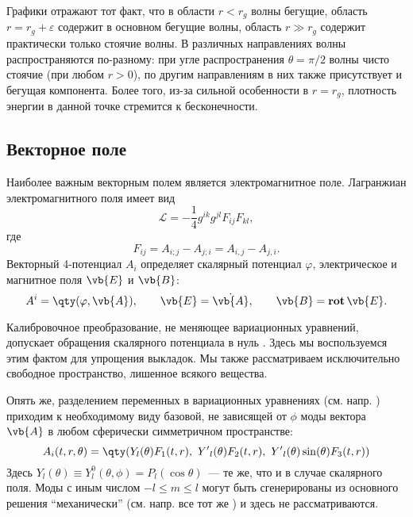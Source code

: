 \documentclass[\docroot/reports/draft/report.tex]{subfiles}
\begin{document}
        Графики отражают тот факт, что в области $r < r_g$ волны бегущие, область $r = r_g + \varepsilon$ содержит в основном бегущие волны, область $r \gg r_g$ содержит практически только стоячие волны. В различных направлениях волны распространяются по-разному: при угле распространения $\theta = \pi/2$ волны чисто стоячие (при любом $r > 0$), по другим направлениям в них также присутствует и бегущая компонента. Более того, из-за сильной особенности в $r = r_g$, плотность энергии в данной точке стремится к бесконечности.

\subsection{Векторное поле}

    Наиболее важным векторным полем является электромагнитное поле. Лагранжиан электромагнитного поля имеет вид \cite{landau_v2}
    \begin{equation*}
        \mathcal{L} = - \frac{1}{4} g^{ik} g^{jl} F_{ij} F_{kl} ,
    \end{equation*}
    где
    \begin{equation*}
        F_{ij} = A_{i;j} - A_{j;i} = A_{i,j} - A_{j,i} .
    \end{equation*}
    Векторный 4-потенциал $A_i$ определяет скалярный потенциал $\varphi$, электрическое и магнитное поля $\vb{E}$ и $\vb{B}$:
    \begin{equation*}
        A^i = \qty(\varphi, \vb{A}), \qquad
        \vb{E} = \dot{\vb{A}}, \qquad
        \vb{B} = \mathop{\mathbf{rot}}{\vb{E}} .
    \end{equation*}

    Калибровочное преобразование, не меняющее вариационных уравнений, допускает обращения скалярного потенциала в нуль \cite{landau_v2}. Здесь мы воспользуемся этим фактом для упрощения выкладок. Мы также рассматриваем исключительно свободное пространство, лишенное всякого вещества.

    Опять же, разделением переменных в вариационных уравнениях (см. напр. \cite{BurVas2019}) приходим к необходимому виду базовой, не зависящей от $\phi$ моды вектора $\vb{A}$ в любом сферически симметричном пространстве:
    \begin{equation*}
        A_i(t,r,\theta) = \qty(Y_l(\theta) F_1(t,r),\ {Y'}_l(\theta) F_2(t,r),\ {Y'}_l(\theta) \sin(\theta) F_3(t,r))
    \end{equation*}
    Здесь $Y_l(\theta) \equiv Y_l^0(\theta,\phi) = P_l(\cos\theta)$~--- те же, что и в случае скалярного поля. Моды с иным числом $-l \le m \le l$ могут быть сгенерированы из основного решения \enquote{механически} (см. напр. все тот же \cite{BurVas2019}) и здесь не рассматриваются.
\end{document}
